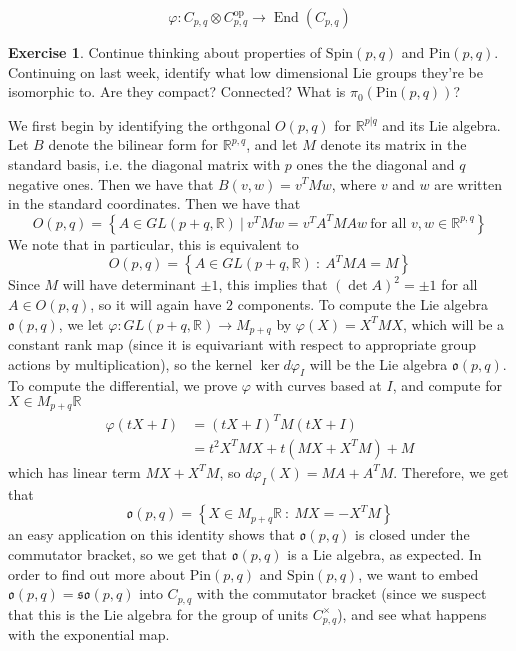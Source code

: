 \documentclass[psamsfonts]{amsart}
\theoremstyle{definition}
\newtheorem{exer}[thm]{Exercise}
\theoremstyle{remark}
\newcommand{\R}{\mathbb{R}}
\newcommand{\Spin}{\mathrm{Spin}}
\newcommand{\Pin}{\mathrm{Pin}}
\newcommand{\set}[1]{\left\lbrace #1 \right\rbrace}
\DeclareMathOperator{\End}{End}
\begin{document}
$$\varphi : C_{p,q} \otimes C_{p,q}^\text{op} \to \End(C_{p,q}) $$
%
\begin{exer}
Continue thinking about properties of $\Spin(p,q)$ and $\Pin(p,q)$. Continuing on last week, identify what low dimensional Lie groups they're be isomorphic to. Are they compact? Connected? What is $\pi_0(\Pin(p,q))$?
\end{exer}
We first begin by identifying the orthgonal $O(p,q)$ for $\R^{p|q}$ and its Lie algebra. Let $B$ denote the bilinear form for $\R^{p,q}$, and let $M$ denote its matrix in the standard basis, i.e. the diagonal matrix with $p$ ones the the diagonal and $q$ negative ones. Then we have that $B(v,w) = v^TMw$, where $v$ and $w$ are written in the standard coordinates. Then we have that 
$$O(p,q) = \set{A \in GL(p+q,\R) ~|~ v^TMw = v^TA^TMAw ~ \text{for all } v,w \in \R^{p,q}} $$
We note that in particular, this is equivalent to 
$$O(p,q) = \set{A \in GL(p+q, \R) ~:~ A^TMA = M} $$
Since $M$ will have determinant $\pm 1$, this implies that $(\det A)^2 = \pm 1$ for all $A \in O(p,q)$, so it will again have $2$ components. To compute the Lie algebra $\mathfrak{o}(p,q)$, we let $\varphi : GL(p+q, \R) \to M_{p + q}$ by $\varphi(X) = X^TMX$, which will be a constant rank map (since it is equivariant with respect to appropriate group actions by multiplication), so the kernel $\ker d\varphi_I$ will be the Lie algebra $\mathfrak{o}(p,q)$. To compute the differential, we prove $\varphi$ with curves based at $I$, and compute for $X \in M_{p+q}\R$
\begin{align*}
\varphi(tX + I) &= (tX + I)^T M (tX + I) \\
&= t^2X^TMX + t(MX + X^TM) + M
\end{align*}
which has linear term $MX + X^TM$, so $d\varphi_I(X) = MA + A^TM$. Therefore, we get that 
$$\mathfrak{o}(p,q) = \set{X \in M_{p+q}\R ~:~ MX = -X^TM} $$
an easy application on this identity shows that $\mathfrak{o}(p,q)$ is closed under the commutator bracket, so we get that $\mathfrak{o}(p,q)$ is a Lie algebra, as expected. In order to find out more about $\Pin(p,q)$ and $\Spin(p,q)$, we want to embed $\mathfrak{o}(p,q) = \mathfrak{so}(p,q)$ into $C_{p,q}$ with the commutator bracket (since we suspect that this is the Lie algebra for the group of units $C_{p,q}^\times$), and see what happens with the exponential map. 
\end{document}

